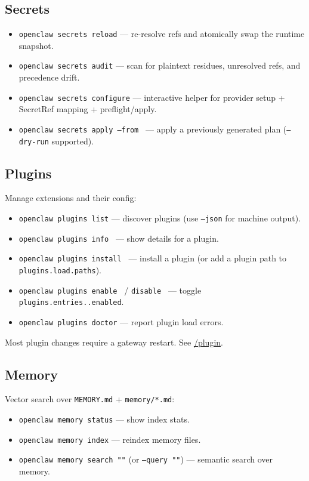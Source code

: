 \subsection{Secrets}


\begin{itemize}
  \item \texttt{openclaw secrets reload} — re-resolve refs and atomically swap the runtime snapshot.
  \item \texttt{openclaw secrets audit} — scan for plaintext residues, unresolved refs, and precedence drift.
  \item \texttt{openclaw secrets configure} — interactive helper for provider setup + SecretRef mapping + preflight/apply.
  \item \texttt{openclaw secrets apply --from } — apply a previously generated plan (\texttt{--dry-run} supported).
\end{itemize}


\subsection{Plugins}


Manage extensions and their config:

\begin{itemize}
  \item \texttt{openclaw plugins list} — discover plugins (use \texttt{--json} for machine output).
  \item \texttt{openclaw plugins info } — show details for a plugin.
  \item \texttt{openclaw plugins install } — install a plugin (or add a plugin path to \texttt{plugins.load.paths}).
  \item \texttt{openclaw plugins enable } / \texttt{disable } — toggle \texttt{plugins.entries..enabled}.
  \item \texttt{openclaw plugins doctor} — report plugin load errors.
\end{itemize}


Most plugin changes require a gateway restart. See \href{/tools/plugin}{/plugin}.

\subsection{Memory}


Vector search over \texttt{MEMORY.md} + \texttt{memory/*.md}:

\begin{itemize}
  \item \texttt{openclaw memory status} — show index stats.
  \item \texttt{openclaw memory index} — reindex memory files.
  \item \texttt{openclaw memory search ""} (or \texttt{--query ""}) — semantic search over memory.
\end{itemize}


